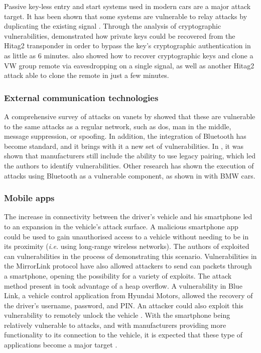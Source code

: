 Passive key-less entry and start systems used in modern cars are a major attack target. It has been shown that some systems are vulnerable to relay attacks by duplicating the existing signal \citep{francillon2011relay}. Through the analysis of cryptographic vulnerabilities, \cite{verdult2012gone} demonstrated how private keys could be recovered from the Hitag2 transponder in order to bypass the key's cryptographic authentication in as little as 6 minutes. \cite{garcia2016lock} also showed how to recover cryptographic keys and clone a VW group remote via eavesdropping on a single signal, as well as another Hitag2 attack able to clone the remote in just a few minutes.\par

\subsubsection{External communication technologies}

A comprehensive survey of attacks on \glspl{vanet} by \cite{Hasrouny2017} showed that these are vulnerable to the same attacks as a regular network, such as \gls{dos}, man in the middle, message suppression, or spoofing. In addition, the integration of Bluetooth has become standard, and it brings with it a new set of vulnerabilities. In \cite{Cheah2017}, it was shown that manufacturers still include the ability to use legacy pairing, which led the authors to identify vulnerabilities. Other research has shown the execution of attacks using Bluetooth as a vulnerable component, as shown in \cite{Cai2019} with BMW cars.

\subsubsection{Mobile apps}

The increase in connectivity between the driver's vehicle and his smartphone led to an expansion in the vehicle's attack surface. A malicious smartphone app could be used to gain unauthorised access to a vehicle without needing to be in its proximity (\textit{i.e.} using long-range wireless networks). The authors of \cite{Woo2015} exploited \gls{can} vulnerabilities in the process of demonstrating this scenario. Vulnerabilities in the MirrorLink protocol have also allowed attackers to send \gls{can} packets through a smartphone, opening the possibility for a variety of exploits. The attack method present in \cite{mazloom2016security} took advantage of a heap overflow. A vulnerability in Blue Link, a vehicle control application from Hyundai Motors, allowed the recovery of the driver's username, password, and PIN. An attacker could also exploit this vulnerability to remotely unlock the vehicle \citep{toddbluelink}. With the smartphone being relatively vulnerable to attacks, and with manufacturers providing more functionality to its connection to the vehicle, it is expected that these type of applications become a major target \citep{Kim2021}.

